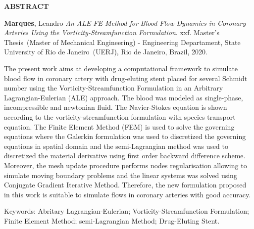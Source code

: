 \begin{center}
\textbf{ABSTRACT}
\end{center}


$\!$\\

\hspace{-1.3cm}\textbf{Marques}, Leandro \textit{An ALE-FE Method for Blood Flow Dynamics in Coronary Arteries Using the Vorticity-Streamfunction Formulation}. xxf. Master's Thesis~(Master of Mechanical Engineering) - Engineering Departament, State University of Rio de Janeiro~(UERJ), Rio de Janeiro, Brazil, 2020.

\vspace{.2cm}

\indent 
The present work aims at developing a 
computational framework to simulate blood flow 
in coronary artery with
drug-eluting stent placed for several Schmidt number using the Vorticity-Streamfunction 
Formulation in an Arbitrary Lagrangian-Eulerian (ALE) approach.
The blood was modeled as single-phase, incompressible 
and newtonian fluid. The Navier-Stokes equation is 
shown according to the vorticity-streamfunction 
formulation with species transport equation.
The Finite Element Method (FEM) is used to solve 
the governing equations where the Galerkin formulation was used
to discretized the governing equations in spatial domain 
and the semi-Lagrangian method was used to discretized 
the material derivative using first order backward difference scheme. 
Moreover, the mesh update procedure performs nodes regularisation
allowing to simulate moving boundary problems and
the linear systems was solved using Conjugate 
Gradient Iterative Method.
Therefore, the new formulation proposed in this work 
is suitable to simulate flows in coronary arteries with good accuracy. 

\vspace{1cm}

\hspace{-1.3cm}Keywords: Abritary Lagrangian-Eulerian; Vorticity-Streamfunction Formulation; Finite Element Method; semi-Lagrangian Method; Drug-Eluting Stent.
